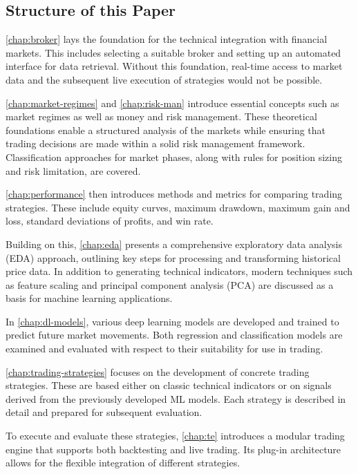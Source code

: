 \subsection{Structure of this Paper}


\autoref{chap:broker} lays the foundation for the technical integration with financial markets.
This includes selecting a suitable broker and setting up an automated interface for data retrieval.
Without this foundation, real-time access to market data and the subsequent live execution of strategies would not be possible.

\autoref{chap:market-regimes} and \autoref{chap:risk-man} introduce essential concepts such as market regimes as well as money and risk management.
These theoretical foundations enable a structured analysis of the markets while ensuring that trading decisions are made within a solid risk management framework.
Classification approaches for market phases, along with rules for position sizing and risk limitation, are covered.

\autoref{chap:performance} then introduces methods and metrics for comparing trading strategies.
These include equity curves, maximum drawdown, maximum gain and loss, standard deviations of profits, and win rate.

Building on this, \autoref{chap:eda} presents a comprehensive exploratory data analysis (EDA) approach, outlining key steps for processing and transforming historical price data.
In addition to generating technical indicators, modern techniques such as feature scaling and principal component analysis (PCA) are discussed as a basis for machine learning applications.

In \autoref{chap:dl-models}, various deep learning models are developed and trained to predict future market movements.
Both regression and classification models are examined and evaluated with respect to their suitability for use in trading.

\autoref{chap:trading-strategies} focuses on the development of concrete trading strategies.
These are based either on classic technical indicators or on signals derived from the previously developed ML models.
Each strategy is described in detail and prepared for subsequent evaluation.

To execute and evaluate these strategies, \autoref{chap:te} introduces a modular trading engine that supports both backtesting and live trading.
Its plug-in architecture allows for the flexible integration of different strategies.

